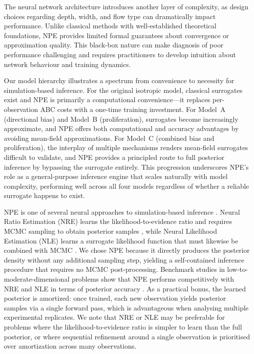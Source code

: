 \documentclass{article}
\begin{document}
The neural network architecture introduces another layer of complexity, as design choices regarding depth, width, and flow type can dramatically impact performance. Unlike classical methods with well-established theoretical foundations, NPE provides limited formal guarantees about convergence or approximation quality. This black-box nature can make diagnosis of poor performance challenging and requires practitioners to develop intuition about network behaviour and training dynamics.

Our model hierarchy illustrates a spectrum from convenience to necessity for simulation-based inference. For the original isotropic model, classical surrogates exist and NPE is primarily a computational convenience---it replaces per-observation ABC costs with a one-time training investment. For Model~A (directional bias) and Model~B (proliferation), surrogates become increasingly approximate, and NPE offers both computational and accuracy advantages by avoiding mean-field approximations. For Model~C (combined bias and proliferation), the interplay of multiple mechanisms renders mean-field surrogates difficult to validate, and NPE provides a principled route to full posterior inference by bypassing the surrogate entirely. This progression underscores NPE's role as a general-purpose inference engine that scales naturally with model complexity, performing well across all four models regardless of whether a reliable surrogate happens to exist.

NPE is one of several neural approaches to simulation-based inference \citep{Cranmer2020FrontierSBI,2025arXiv250812939D}. Neural Ratio Estimation (NRE) learns the likelihood-to-evidence ratio and requires MCMC sampling to obtain posterior samples \citep{hermans2020likelihood}, while Neural Likelihood Estimation (NLE) learns a surrogate likelihood function that must likewise be combined with MCMC \citep{papamakarios2019sequential}. We chose NPE because it directly produces the posterior density without any additional sampling step, yielding a self-contained inference procedure that requires no MCMC post-processing. Benchmark studies in low-to-moderate-dimensional problems show that NPE performs competitively with NRE and NLE in terms of posterior accuracy \citep{lueckmann2021benchmarking}. As a practical bonus, the learned posterior is amortized: once trained, each new observation yields posterior samples via a single forward pass, which is advantageous when analysing multiple experimental replicates. We note that NRE or NLE may be preferable for problems where the likelihood-to-evidence ratio is simpler to learn than the full posterior, or where sequential refinement around a single observation is prioritised over amortization across many observations.
\end{document}
